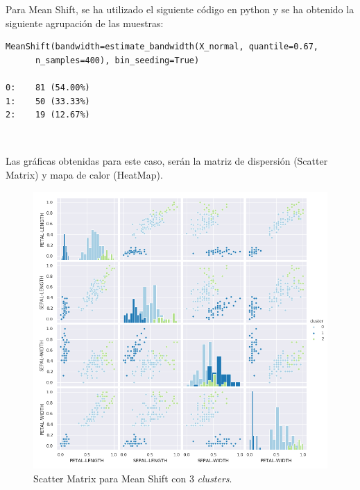 \documentclass[a4paper, 20pt]{article}
\begin{document}
{\clearpage

Para Mean Shift, se ha utilizado el siguiente código en python y se ha obtenido la siguiente agrupación de las muestras:\\

\begin{lstlisting}
MeanShift(bandwidth=estimate_bandwidth(X_normal, quantile=0.67, 
	  n_samples=400), bin_seeding=True)

0:    81 (54.00%)
1:    50 (33.33%)
2:    19 (12.67%)
\end{lstlisting}\

Las gráficas obtenidas para este caso, serán la matriz de dispersión (Scatter Matrix) y mapa de calor (HeatMap).\\

\begin{figure}[h]
\centering
\includegraphics[scale=0.64]{dani/scatmatrixMeanShiftIRIS.png}
\caption{Scatter Matrix para Mean Shift con 3 \textit{clusters}.}
\label{smms}
\end{figure}

\clearpage

}
\end{document}
